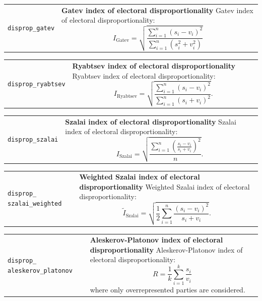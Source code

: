 \documentclass[
]{scrartcl}
\begin{document}
\begin{longtable}{p{3.2cm}| p{11cm}}
\texttt{disprop\_gatev} &\textbf{Gatev index of electoral disproportionality}\newline 
Gatev index of electoral disproportionality:
           \begin{equation}I_{\text{Gatev}} = \sqrt{\frac{\sum_{i=1}^{n}\left(s_i - v_i\right)^2}{\sum_{i=1}^{n}\left(s_i^2 + v_i^2\right)}}\end{equation}
\end{longtable}

\begin{longtable}{p{3.2cm}| p{11cm}}
\texttt{disprop\_ryabtsev} &\textbf{Ryabtsev  index of electoral disproportionality}\newline 
Ryabtsev  index of electoral disproportionality:
           \begin{equation}I_{\text{Ryabtsev}} = \sqrt{\frac{\sum_{i=1}^{n}\left(s_i - v_i\right)^2}{\sum_{i=1}^{n}\left(s_i + v_i\right)^2}}.\end{equation}
\end{longtable}

\begin{longtable}{p{3.2cm}| p{11cm}}
\texttt{disprop\_szalai} &\textbf{Szalai index of electoral disproportionality}\newline 
Szalai index of electoral disproportionality:
           \begin{equation}I_{\text{Szalai}} = \sqrt{\frac{\sum_{i=1}^{n}\left(\frac{s_i-v_i}{s_i+v_i}\right)^2}{n}}.\end{equation}
\end{longtable}

\begin{longtable}{p{3.2cm}| p{11cm}}
\texttt{disprop\_
szalai\_weighted} &\textbf{Weighted Szalai index of electoral disproportionality}\newline 
Weighted Szalai index of electoral disproportionality:
           \begin{equation}\tilde{I}_{\text{Szalai}} = \sqrt{\frac{1}{2}\sum_{i=1}^{n}\frac{\left(s_i-v_i\right)^2}{s_i+v_i}}.\end{equation}
\end{longtable}

\begin{longtable}{p{3.2cm}| p{11cm}}
\texttt{disprop\_
aleskerov\_platonov} &\textbf{Aleskerov-Platonov index of electoral disproportionality}\newline 
Aleskerov-Platonov index of electoral disproportionality:
           \begin{equation}R = \frac{1}{k}\sum_{i=1}^{k}\frac{s_i}{v_i}\end{equation}
           where only overrepresented parties are considered.
\end{longtable}
\end{document}
